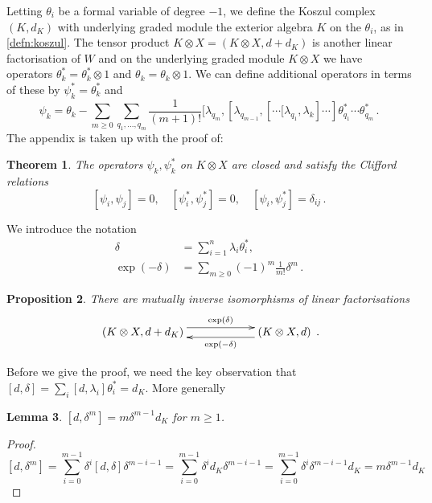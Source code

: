 \documentclass[english,letter paper,12pt,leqno]{article}
\newtheorem{theorem}{Theorem}[section]
\newtheorem{proposition}[theorem]{Proposition}
\newtheorem{lemma}[theorem]{Lemma}
\theoremstyle{example}
\numberwithin{equation}{section}
\begin{document}
Letting $\theta_i$ be a formal variable of degree $-1$, we define the Koszul complex $(K,d_K)$ with underlying graded module the exterior algebra $K$ on the $\theta_i$, as in \eqref{defn:koszul}. The tensor product $K \otimes X = (K \otimes X, d + d_K)$ is another linear factorisation of $W$ and on the underlying graded module $K \otimes X$ we have operators $\theta_k^* = \theta_k^* \otimes 1$ and $\theta_k = \theta_k \otimes 1$. We can define additional operators in terms of these by $\psi_k^* = \theta_k^*$ and
\begin{equation}
\psi_k = \theta_k - \sum_{m \ge 0} \sum_{q_1,\ldots,q_m} \frac{1}{(m+1)!} [ \lambda_{q_m}, [ \lambda_{q_{m-1}}, [ \cdots \big[ \lambda_{q_1}, \lambda_k ] \cdots ] \theta_{q_1}^* \cdots \theta_{q_m}^*\,.
\end{equation}
The appendix is taken up with the proof of:

\begin{theorem}\label{theorem:psik} The operators $\psi_k, \psi_k^*$ on $K \otimes X$ are closed and satisfy the Clifford relations
\begin{equation}\label{eq:clifford_reln_psi}
[ \psi_i, \psi_j ] = 0, \quad [ \psi_i^{*}, \psi_j^{*} ] = 0, \quad [ \psi_i, \psi_j^{*} ] = \delta_{ij}\,.
\end{equation}
\end{theorem}

We introduce the notation
\begin{align*}
\delta &= \sum_{i=1}^n \lambda_i \theta_i^*,\\
\exp(-\delta) &= \sum_{m \ge 0} (-1)^m \frac{1}{m!} \delta^m\,.
\end{align*}

\begin{proposition}\label{prop:equivalencekoszul} There are mutually inverse isomorphisms of linear factorisations
\[
\xymatrix@C+3pc{ (K \otimes X, d + d_K) \ar@<1ex>[r]^-{ \exp(\delta) } & (K \otimes X, d) \ar@<1ex>[l]^-{ \exp(-\delta) } }\,.
\]
\end{proposition}

Before we give the proof, we need the key observation that $[d, \delta] = \sum_i [d, \lambda_i] \theta_i^* = d_K$. More generally

\begin{lemma}\label{lemma:pert1} $[d, \delta^m] = m \delta^{m-1} d_K$ for $m \ge 1$.
\end{lemma}
\begin{proof}
\[
[ d, \delta^m ] = \sum_{i=0}^{m-1} \delta^i [d, \delta] \delta^{m-i-1} = \sum_{i=0}^{m-1} \delta^i d_K \delta^{m-i-1} = \sum_{i=0}^{m-1} \delta^i \delta^{m-i-1} d_K = m \delta^{m-1} d_K
\]
\end{proof}
\end{document}
